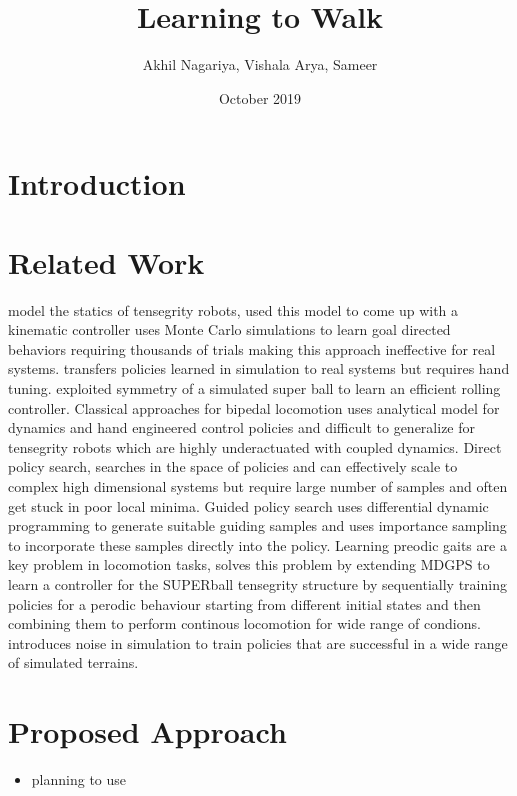 \documentclass[a4paper,10pt]{article}
\title{Learning to Walk}
\author{Akhil Nagariya, Vishala Arya, Sameer}
\date{October 2019}
\begin{document}
\maketitle
  \section{Introduction}
  \section{Related Work}
  \cite{15-17} model the statics of tensegrity robots, \cite{18} used this model to come up with 
  a kinematic controller \cite{22} uses Monte Carlo simulations to learn goal directed behaviors
  requiring thousands of trials making this approach ineffective for real systems. 
  \cite{23} transfers policies learned in simulation to real systems but requires hand tuning. 
  \cite{20} exploited symmetry of a simulated super ball to learn an efficient rolling controller.
  Classical approaches\cite{} for bipedal locomotion uses analytical model for dynamics and hand engineered
  control policies and difficult to generalize for tensegrity robots which are highly underactuated with coupled dynamics.  
  Direct policy search, searches in the space of policies and can effectively scale to 
  complex high dimensional systems but require large number of samples and often get stuck in poor local minima. \cite{pgradient}
  Guided policy search\cite{gps} uses differential dynamic programming to generate suitable guiding samples and uses 
  importance sampling to incorporate these samples directly into the policy. 
  Learning preodic gaits are a key problem in locomotion tasks, 
  \cite{drltens} solves this problem by extending MDGPS\cite{mgpds} to learn a controller for the SUPERball tensegrity structure by sequentially training 
   policies for a perodic behaviour starting from different initial states and then combining them to perform continous locomotion for wide range of
   condions. \cite{drltens} introduces noise in simulation to train policies that are successful in a wide range of simulated terrains. 
  
  \section{Proposed Approach}
  \begin{itemize}
    \item planning to use \cite{DBLP:journals/corr/MontadgomeryL16}
  \end{itemize}
  \cite{gps}
  \cite{vps}
  \cite{2014-cgps}
  \cite{DBLP:journals/corr/LevineFDA15}
  \cite{DBLP:journals/corr/MontgomeryL16}
  \cite{DBLP:journals/corr/GengZBCVSAL16}
   
  
\end{document}

